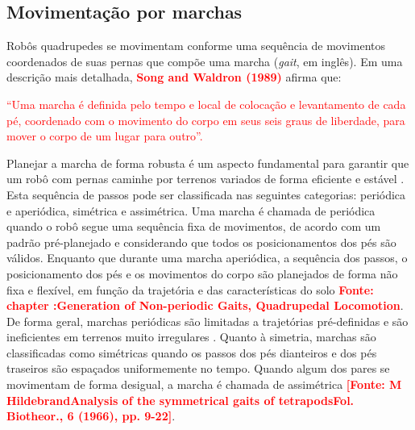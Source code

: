 \documentclass[../main.tex]{subfiles}
\begin{document}
  \subsection{Movimentação por marchas}
  Robôs quadrupedes se movimentam conforme uma sequência de movimentos coordenados de suas pernas que compõe uma marcha (\textit{gait}, em inglês). Em uma descrição mais detalhada, \textbf{\textcolor{red}{Song and Waldron (1989)}} afirma que: 

  \textcolor{red}{“Uma marcha é definida pelo tempo e local de colocação e levantamento de cada pé, coordenado com o movimento do corpo em seus seis graus de liberdade, para mover o corpo de um lugar para outro”.}

  Planejar a marcha de forma robusta é um aspecto fundamental para garantir que um robô com pernas caminhe por terrenos variados de forma eficiente e estável \cite{X.129}. Esta sequência de passos pode ser classificada nas seguintes categorias: periódica e aperiódica, simétrica e assimétrica. Uma marcha é chamada de periódica quando o robô segue uma sequência fixa de movimentos, de acordo com um padrão pré-planejado e considerando que todos os posicionamentos dos pés são válidos. Enquanto que durante uma marcha aperiódica, a sequência dos passos, o posicionamento dos pés e os movimentos do corpo são planejados de forma não fixa e flexível, em função da trajetória e das características do solo \textbf{\textcolor{red}{Fonte: chapter :Generation of Non-periodic Gaits, Quadrupedal Locomotion}}. De forma geral, marchas periódicas são limitadas a trajetórias pré-definidas e são ineficientes em terrenos muito irregulares \cite{X.129}. Quanto à simetria, marchas são classificadas como simétricas quando os passos dos pés dianteiros e dos pés traseiros são espaçados uniformemente no tempo. Quando algum dos pares se movimentam de forma desigual, a marcha é chamada de assimétrica \textbf{\textcolor{red}{[Fonte: M HildebrandAnalysis of the symmetrical gaits of tetrapodsFol. Biotheor., 6 (1966), pp. 9-22]}}.
\end{document}
